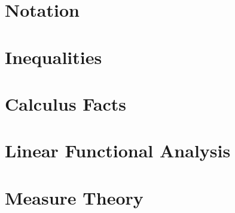 \appendix

\chapter{Notation}
\label{chap:appendix-notation}


\chapter{Inequalities}
\label{chap:appendix-inequalities}


\chapter{Calculus Facts}
\label{chap:appendix-calculus-facts}


\chapter{Linear Functional Analysis}
\label{chap:appendix-linear-functional-analysis}


\chapter{Measure Theory}
\label{chap:appendix-measure-theory}

